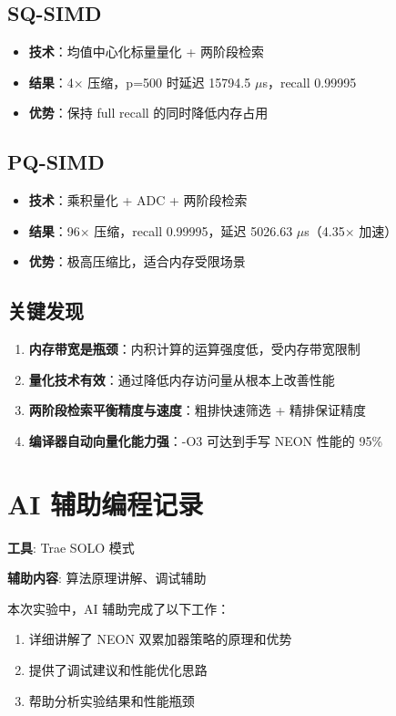 \documentclass[a4paper]{article}
\begin{document}
\subsection{SQ-SIMD}
\begin{itemize}
  \item \textbf{技术}：均值中心化标量量化 + 两阶段检索
  \item \textbf{结果}：4$\times$ 压缩，p=500 时延迟 15794.5 $\mu$s，recall 0.99995
  \item \textbf{优势}：保持 full recall 的同时降低内存占用
\end{itemize}

\subsection{PQ-SIMD}
\begin{itemize}
  \item \textbf{技术}：乘积量化 + ADC + 两阶段检索
  \item \textbf{结果}：96$\times$ 压缩，recall 0.99995，延迟 5026.63 $\mu$s（4.35$\times$ 加速）
  \item \textbf{优势}：极高压缩比，适合内存受限场景
\end{itemize}

\subsection{关键发现}

\begin{enumerate}
  \item \textbf{内存带宽是瓶颈}：内积计算的运算强度低，受内存带宽限制
  \item \textbf{量化技术有效}：通过降低内存访问量从根本上改善性能
  \item \textbf{两阶段检索平衡精度与速度}：粗排快速筛选 + 精排保证精度
  \item \textbf{编译器自动向量化能力强}：-O3 可达到手写 NEON 性能的 95\%
\end{enumerate}

\newpage
\appendix

\section{AI 辅助编程记录}

\textbf{工具}: Trae SOLO 模式

\textbf{辅助内容}: 算法原理讲解、调试辅助

本次实验中，AI 辅助完成了以下工作：
\begin{enumerate}
  \item 详细讲解了 NEON 双累加器策略的原理和优势
  \item 提供了调试建议和性能优化思路
  \item 帮助分析实验结果和性能瓶颈
\end{enumerate}
\end{document}

